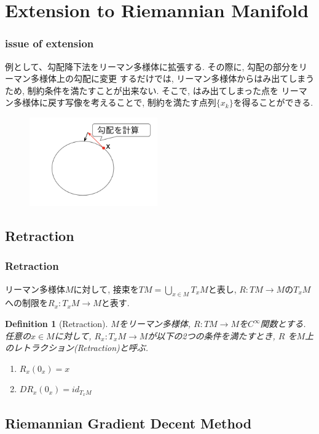\documentclass[dvipdfmx,11pt]{beamer}		%
\newtheorem{defi}{Definition}
\newcommand{\tpm}{T_xM}
\begin{document}
    
   
    \section{Extension to Riemannian Manifold}

    \begin{frame}\frametitle{issue of extension}
        例として、勾配降下法をリーマン多様体に拡張する. その際に, 勾配の部分をリーマン多様体上の勾配に変更
        するだけでは, リーマン多様体からはみ出てしまうため, 制約条件を満たすことが出来ない. そこで, はみ出てしまった点を
        リーマン多様体に戻す写像を考えることで, 制約を満たす点列$\{x_k\}$を得ることができる.
        \begin{figure}
            \centering
            \includegraphics[width = 5.5cm]{../Images/grad_image.png}
        \end{figure}
    \end{frame}
    \subsection{Retraction}
    \begin{frame}\frametitle{Retraction}
        リーマン多様体$M$に対して, 接束を$\displaystyle TM = \bigcup_{x\in M}\tpm$と表し, 
        $R : TM\to M$の$\tpm$への制限を$R_x : \tpm\to M$と表す.
        \begin{defi}[Retraction]
            $M$をリーマン多様体, $R : TM\to M$を$C^\infty$関数とする. 
            任意の$x\in M$に対して, $R_x : \tpm\to M$が以下の2つの条件を満たすとき, $R$
            を$M$上のレトラクション(Retraction)と呼ぶ.
            \begin{enumerate}
                \item $R_x(0_x) = x$
                \item $DR_x(0_x) = id_{\tpm}$
            \end{enumerate}
        \end{defi}
    \end{frame}

    \subsection{Riemannian Gradient Decent Method}
    
\end{document}
